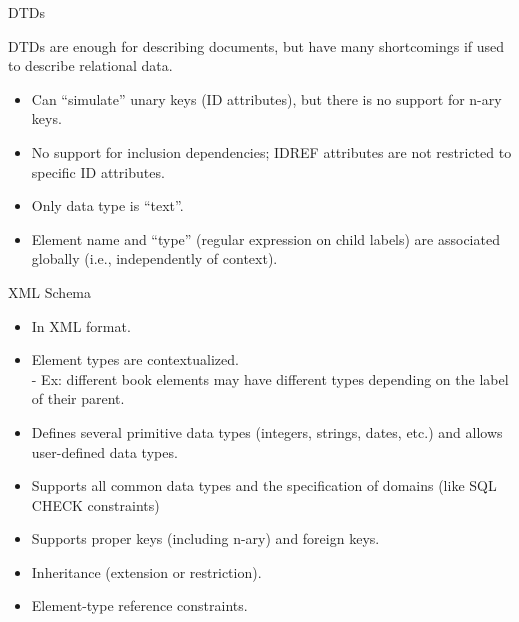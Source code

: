 \begin{frame}{DTDs}

DTDs are enough for describing documents, but have many shortcomings if used to describe relational data.

\begin{itemize}[-]
\item Can ``simulate'' unary keys (ID attributes), but there is no support for n-ary keys.

\item No support for inclusion dependencies; IDREF attributes are not restricted to specific ID attributes.

\item Only data type is ``text''.

\item Element name and ``type'' (regular expression on child labels) are associated globally (i.e., independently of context).

\end{itemize}
\end{frame}

\begin{frame}[fragile]{XML Schema}
\begin{itemize}[-]
\item In XML format.
\item Element types are contextualized.\\
 - Ex: different book elements may have different types depending on the label of their parent.
\item Defines several primitive data types (integers, strings, dates, etc.) and allows user-defined data types.
\item Supports all common data types and the specification of domains (like SQL CHECK constraints)
\item Supports proper keys (including n-ary) and foreign keys.
\item Inheritance (extension or restriction).
\item Element-type reference constraints.
\end{itemize}
\end{frame}

